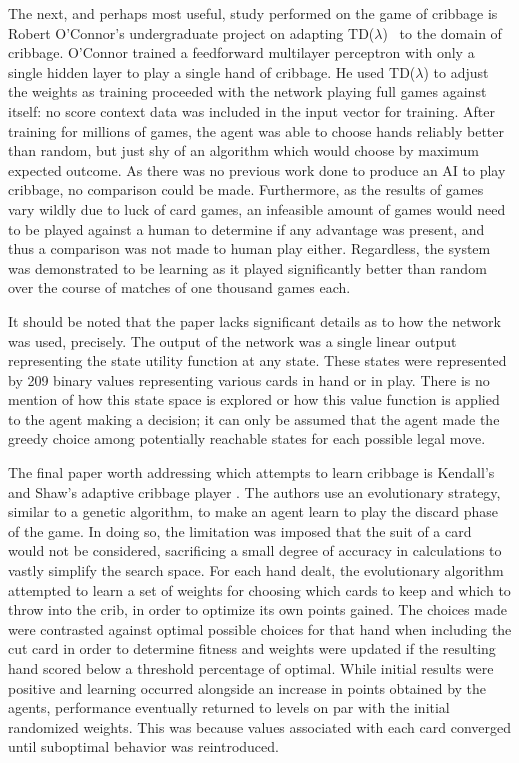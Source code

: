 The next,
and perhaps most useful,
study performed on the game of cribbage is Robert O'Connor's undergraduate
project
\cite{roconnor_cs486}
on adapting TD($\lambda$)~\cite{tdgammon} to the domain of cribbage.
%
O'Connor trained a feedforward multilayer perceptron with only a single hidden
layer to play a single hand of cribbage.
%
He used TD($\lambda$) to adjust the weights as training proceeded with the
network playing full games against itself:
no score context data was included in the input vector for training.
%
After training for millions of games,
the agent was able to choose hands reliably better than random,
but just shy of an algorithm which would choose by maximum expected outcome.
%
As there was no previous work done to produce an AI to play cribbage,
no comparison could be made.
%
Furthermore,
as the results of games vary wildly due to luck of card games,
an infeasible amount of games would need to be played against a human to
determine if any advantage was present,
and thus a comparison was not made to human play either.
%
Regardless,
the system was demonstrated to be learning as it played significantly
better than random over the course of matches of one thousand games each.

It should be noted that the paper lacks significant details
as to how the network was used, precisely.
%
The output of the network was a single linear output representing the state
utility function at any state.
%
These states were represented by 209 binary values representing various cards in
hand or in play.
%
There is no mention of how this state space is explored or how this value
function is applied to the agent making a decision;
it can only be assumed that the agent made the greedy choice among potentially
reachable states for each possible legal move.

The final paper worth addressing which attempts to learn cribbage
is Kendall's and Shaw's adaptive cribbage player
\cite{adaptive_cribbage}.
%
The authors use an evolutionary strategy,
similar to a genetic algorithm,
to make an agent learn to play the discard phase of the game.
%
In doing so,
the limitation was imposed that the suit of a card would not be considered,
sacrificing a small degree of accuracy in calculations to vastly simplify the
search space.
%
For each hand dealt,
the evolutionary algorithm attempted to learn a set of weights for choosing
which cards to keep and which to throw into the crib,
in order to optimize its own points gained.
%
The choices made were contrasted against optimal possible choices for that hand
when including the cut card in order to determine fitness
and weights were updated if the resulting hand scored below a threshold
percentage of optimal.
%
While initial results were positive and learning occurred alongside an increase
in points obtained by the agents,
performance eventually returned to levels on par with the initial randomized
weights.
%
This was because values associated with each card converged until suboptimal
behavior was reintroduced.

